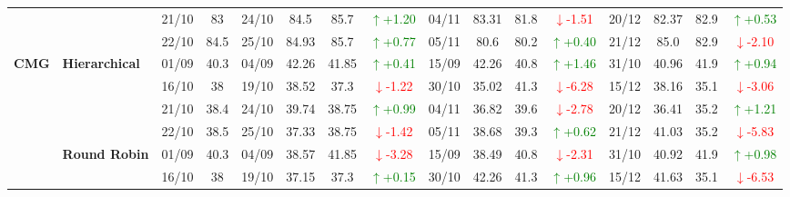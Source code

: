 {\begin{longtable}{llcc|cccc|cccc|cccc}
&
& 21/10 & 83 & 24/10 & 84.5 & 85.7 & \textcolor{green}{\(\uparrow\)+1.20} & 04/11 & 83.31 & 81.8 & \textcolor{red}{\(\downarrow\)-1.51} & 20/12 & 82.37 & 82.9 & \textcolor{green}{\(\uparrow\)+0.53} \\

&
& 22/10 & 84.5 & 25/10 & 84.93 & 85.7 & \textcolor{green}{\(\uparrow\)+0.77} & 05/11 & 80.6 & 80.2 & \textcolor{green}{\(\uparrow\)+0.40} & 21/12 & 85.0 & 82.9 & \textcolor{red}{\(\downarrow\)-2.10} \\




\midrule


\multirow{12}{*}{\textbf{CMG}} 
& \textbf{Hierarchical}
& 01/09 & 40.3 & 04/09 & 42.26 & 41.85 & \textcolor{green}{\(\uparrow\)+0.41} & 15/09 & 42.26 & 40.8 & \textcolor{green}{\(\uparrow\)+1.46} & 31/10 & 40.96 & 41.9 & \textcolor{green}{\(\uparrow\)+0.94} \\

& 
& 16/10 & 38 & 19/10 & 38.52 & 37.3 & \textcolor{red}{\(\downarrow\)-1.22} & 30/10 & 35.02 & 41.3 & \textcolor{red}{\(\downarrow\)-6.28} & 15/12 & 38.16 & 35.1 & \textcolor{red}{\(\downarrow\)-3.06} \\

& 
& 21/10 & 38.4 & 24/10 & 39.74 & 38.75 & \textcolor{green}{\(\uparrow\)+0.99} & 04/11 & 36.82 & 39.6 & \textcolor{red}{\(\downarrow\)-2.78} & 20/12 & 36.41 & 35.2 & \textcolor{green}{\(\uparrow\)+1.21} \\

&
& 22/10 & 38.5 & 25/10 & 37.33 & 38.75 & \textcolor{red}{\(\downarrow\)-1.42} & 05/11 & 38.68 & 39.3 & \textcolor{green}{\(\uparrow\)+0.62} & 21/12 & 41.03 & 35.2 & \textcolor{red}{\(\downarrow\)-5.83} \\
\cmidrule(lr){2-16}


& \textbf{Round Robin}
& 01/09 & 40.3 & 04/09 & 38.57 & 41.85 & \textcolor{red}{\(\downarrow\)-3.28} & 15/09 & 38.49 & 40.8 & \textcolor{red}{\(\downarrow\)-2.31} & 31/10 & 40.92 & 41.9 & \textcolor{green}{\(\uparrow\)+0.98} \\

& 
& 16/10 & 38 & 19/10 & 37.15 & 37.3 & \textcolor{green}{\(\uparrow\)+0.15} & 30/10 & 42.26 & 41.3 & \textcolor{green}{\(\uparrow\)+0.96} & 15/12 & 41.63 & 35.1 & \textcolor{red}{\(\downarrow\)-6.53} \\


\end{longtable}}
